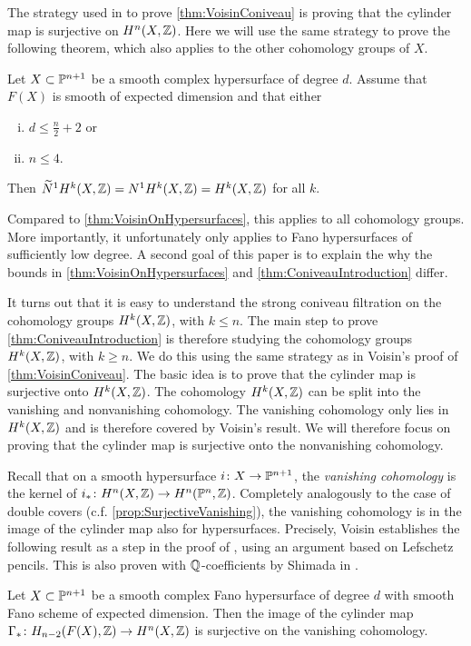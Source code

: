The strategy used in \cite{VoisinConiveauThreefolds} to prove \cref{thm:VoisinConiveau} is proving that the cylinder map is surjective on $H^n(X,\Z)$. Here we will use the same strategy to prove the following theorem, which also applies to the other cohomology groups of $X$.
\begin{theorem}
\label{thm:ConiveauIntroduction}
  Let $X \subset \P^{n+1}$ be a smooth complex hypersurface of degree $d$. Assume that $F(X)$ is smooth of expected dimension and that either
  \begin{enumerate}[i)]
    \item$d \leq \frac{n}{2}+2$ or 
    \item $n \leq 4$.
  \end{enumerate}
Then $\widetilde{N}^1H^k(X,\Z) = N^1H^k(X,\Z) = H^k(X,\Z)$ for all $k$.
\end{theorem}
Compared to \cref{thm:VoisinOnHypersurfaces}, this applies to all cohomology groups. More importantly, it unfortunately only applies to Fano hypersurfaces of sufficiently low degree. A second goal of this paper is to explain the why the bounds in \cref{thm:VoisinOnHypersurfaces} and \cref{thm:ConiveauIntroduction} differ.

It turns out that it is easy to understand the strong coniveau filtration on the cohomology groups $H^k(X,\Z)$, with $k \leq n$. The main step to prove \cref{thm:ConiveauIntroduction} is therefore studying the cohomology groups $H^k(X,\Z)$, with $k \geq n$. We do this using the same strategy as in Voisin's proof of \cref{thm:VoisinConiveau}. The basic idea is to prove that the cylinder map is surjective onto $H^k(X,\Z)$. The cohomology $H^k(X,\Z)$ can be split into the vanishing and nonvanishing cohomology. The vanishing cohomology only lies in $H^k(X,\Z)$ and is therefore covered by Voisin's result. We will therefore focus on proving that the cylinder map is surjective onto the nonvanishing cohomology.

Recall that on a smooth hypersurface $i \from X \to \P^{n+1}$, the \emph{vanishing cohomology} is the kernel of $i_* \from H^n(X,\Z) \to H^n(\P^n,\Z)$. Completely analogously to the case of double covers (c.f. \cref{prop:SurjectiveVanishing}), the vanishing cohomology is in the image of the cylinder map also for hypersurfaces. Precisely, Voisin establishes the following result as a step in the proof of \cite[Theorem 1.13]{VoisinConiveauThreefolds}, using an argument based on Lefschetz pencils. This is also proven with $\Q$-coefficients by Shimada in \cite[Proposition 4]{ShimadaHypersurfaces}.
\begin{proposition}
\label{prop:SurjectiveVanishingHypersurface}
	Let $X \subset \P^{n+1}$ be a smooth complex Fano hypersurface of degree $d$ with smooth Fano scheme of expected dimension. Then the image of the cylinder map $\Gamma_* \from H_{n-2}(F(X),\Z) \to H^n(X,\Z)$ is surjective on the vanishing cohomology.
\end{proposition}

